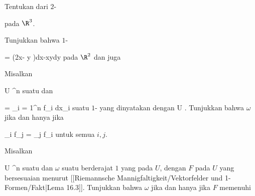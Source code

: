 {}
{

Tentukan
 dari
$2$-

 {  }
 pada $\R^3$.

}
{} {}

{}
{

Tunjukkan bahwa
$1$-

\mavergleichskette
{\vergleichskette
{ \omega
}
{ = }{ (2x- \sin  y )dx-x\cos  ydy
}
{  }{
}
{    }{
}
{   }{
}
}
{}{}{}
pada $\R^2$
dan juga

}
{} {}

{}
{

Misalkan

\mavergleichskette
{\vergleichskette
{ U
}
{ \subseteq }{ \R^n
}
{  }{
}
{    }{
}
{   }{
}
}
{}{}{}
suatu
dan

\mavergleichskette
{\vergleichskette
{ \omega
}
{ = }{ \sum_{i = 1}^n f_i dx_i
}
{  }{
}
{    }{
}
{   }{
}
}
{}{}{}
suatu
$1$-
yang dinyatakan dengan
 { U } { \R
} {}.
Tunjukkan bahwa $\omega$
jika dan hanya jika

\mavergleichskettedisp
{\vergleichskette
{ \partial_i f_j
}
{ =} { \partial_j f_i
}
{ } {
}
{ } {
}
{ } {
}
}
{}{}{}
untuk semua $i,j$.

}
{} {}

{}
{

Misalkan

\mavergleichskette
{\vergleichskette
{ U
}
{ \subseteq }{ \R^n
}
{  }{
}
{    }{
}
{   }{
}
}
{}{}{}
suatu
dan $\omega$ suatu
 berderajat $1$ yang
pada $U$, dengan
$F$ pada $U$ yang bersesuaian menurut
[[Riemannsche Mannigfaltigkeit/Vektorfelder und 1-Formen/Fakt|Lema 16.3]].
Tunjukkan bahwa $\omega$
jika dan hanya jika $F$ memenuhi

}
{} {}

